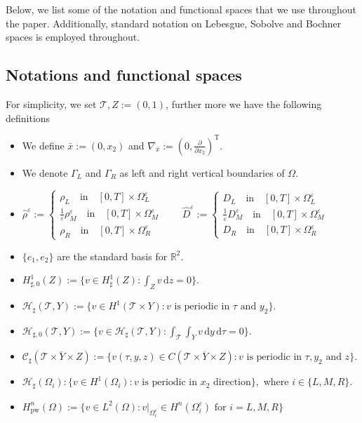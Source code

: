 \documentclass[11pt]{article}
\def\es{\varepsilon}
\def\orr{\Omega_R^\varepsilon}
\def\omm{\Omega_M^\varepsilon}
\def\oll{\Omega_L^\varepsilon}
\def\p{\partial}
\def\T{\mathcal{T}}
\newcommand{\di}[1]{\,\mathrm{d}#1}
\begin{document}
Below, we list some of the notation and functional spaces that we use throughout the paper. Additionally, standard notation on Lebesgue, Sobolve and Bochner spaces is employed throughout.

\subsection{Notations and functional spaces}
For simplicity, we set $\T,Z:=(0,1)$, further more we have the following definitions
\begin{itemize}
    \item We define $\bar x:=(0,x_2)$ and $\nabla_{\bar x}:=\left(0,\frac{\p}{\p x_2}\right)^{\operatorname{T}}.$
    \item  We denote $\Gamma_L$ and $\Gamma_R$ as left and right vertical boundaries of $\Omega.$
    \item  $\hat{\rho}^\es:=\begin{cases}
        \rho_L \quad\mbox{in}\quad [0,T]\times\oll\\
       \frac{1}{\es} \rho_M^\es \quad\mbox{in}\quad [0,T]\times\omm\\
        \rho_R \quad\mbox{in}\quad [0,T]\times\orr
    \end{cases}\qquad
  \hat{D}^\es:=\begin{cases}
        D_L \quad\mbox{in}\quad [0,T]\times\oll\\
        \frac{1}{\es} D_M^\es \quad\mbox{in}\quad [0,T]\times\omm\\
        D_R \quad\mbox{in}\quad [0,T]\times\orr
    \end{cases}$
    \item $\{e_1,e_2\}$ are the standard basis for $\mathbb{R}^2$.
    \item $H_{\sharp,0}^1(Z):=\{v\in {H}_{\sharp}^1(Z):\int_Zv \di{z}=0\}.$
    \item  $\mathcal{H}_{\sharp}(\T,Y):=\{v\in H^1(\T\times Y):v \mbox{ is periodic in } \tau \mbox{ and } y_2\}. $
    \item  $\mathcal{H}_{\sharp,0}(\T,Y):=\{v\in \mathcal{H}_{\sharp}(\T,Y):\int_\T\int_Yv \di{y}\di{\tau}=0\}. $
    \item  $\mathcal{C}_{\sharp}(\overline{\T\times Y\times Z}):=\{v(\tau,y,z)\in C(\overline{\T\times Y\times Z}):v \mbox{ is periodic in } \tau,y_2 \mbox{ and } z\}.$
    \item $\mathcal{H}_{\sharp}(\Omega_i):\{v\in H^1(\Omega_i): v \mbox{ is periodic in } x_2 \mbox{ direction}\},$ where $i\in\{L,M,R\}$.
    \item $H^n_{\text{pw}}(\Omega):=\{v\in L^2(\Omega):v|_{\Omega_i^\es}\in H^n(\Omega_i^\es) \text{  for  } i=L,M,R\}$

\end{itemize}
\end{document}
